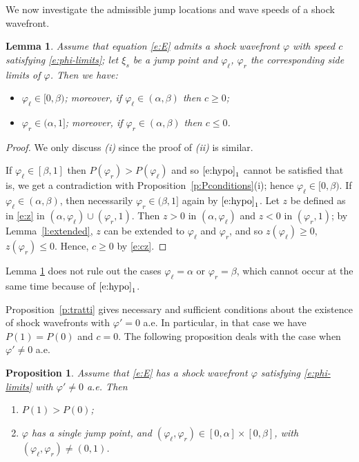\documentclass[11pt,a4paper]{article}
\newtheorem{proposition}{Proposition}[section]
\newtheorem{lemma}{Lemma}[section]
\renewcommand{\phi}{\varphi}
\begin{document}
We now investigate the admissible jump locations and wave speeds of a shock wavefront.

\begin{lemma}\label{l:signC}
Assume that equation \eqref{e:E} admits a shock wavefront $\phi$ with speed $c$ satisfying \eqref{e:phi-limits}; let $\xi_s$ be a jump point and $\phi_\ell$, $\phi_r$ the corresponding side limits of $\phi$. Then we have:
\begin{itemize}
\item[(i)] $\phi_\ell \in [0, \beta)$; moreover, if $\phi_\ell \in (\alpha, \beta)$ then $c\ge 0$;

\item[(ii)] $\phi_r \in (\alpha, 1]$; moreover, if $\phi_r \in (\alpha, \beta)$ then $c\le 0$.
\end{itemize}
\end{lemma}

\begin{proof}
We only discuss {\em (i)} since the proof of {\em (ii)} is similar. 

If $\phi_\ell \in [\beta, 1]$ then $P(\varphi_r)>P(\varphi_\ell)$ and so $\eqref{e:hypo}_1$ cannot be satisfied that is, we get a contradiction with Proposition~\ref{p:Pconditions}(i); hence $\phi_\ell \in [0, \beta)$. If $\phi_\ell \in (\alpha, \beta)$, then necessarily $\phi_r \in (\beta, 1]$ again by $\eqref{e:hypo}_1$. Let $z$ be defined as in \eqref{e:z}  in $(\alpha,\varphi_\ell)\cup(\varphi_r,1)$. Then $z>0$ in $(\alpha,\varphi_\ell)$ and $z<0$ in $(\varphi_r,1)$; by Lemma~\ref{l:extended}, $z$ can be extended to $\phi_{\ell}$ and $\phi_r$, and so $z(\phi_{\ell})\ge 0$, $z(\phi_r)\le 0$. Hence, $c\ge0$ by \eqref{e:cz}.
\end{proof}

Lemma \ref{l:signC} does not rule out the cases $\varphi_\ell = \alpha$ or $\varphi_r =\beta$, which cannot occur at the same time because of $\eqref{e:hypo}_1$. 

Proposition~\ref{p:tratti} gives necessary and sufficient conditions about the existence of shock wavefronts with $\phi'=0$ a.e. In particular, in that case we have $P(1)=P(0)$ and $c=0$. 
The following proposition deals with the case when $\phi'\ne0$ a.e.

\begin{proposition}
\label{prop:necess}
Assume that \eqref{e:E} has a shock wavefront $\phi$ satisfying \eqref{e:phi-limits} with $\phi'\ne0$ a.e. Then
\begin{enumerate}[label=(\roman*)]
\item $P(1) > P(0)$;
\item $\varphi$ has a single jump point, and $(\varphi_\ell,\varphi_r) \in [0,\alpha]\times[0,\beta]$, with $(\varphi_\ell,\varphi_r) \neq (0,1)$.
\end{enumerate}
\end{proposition}
\end{document}

